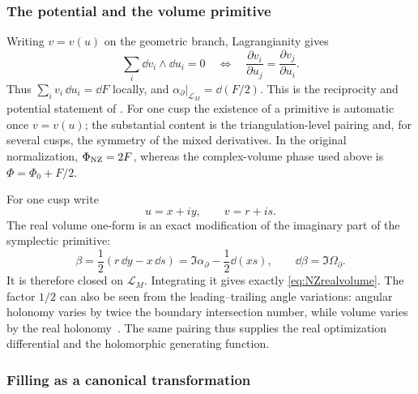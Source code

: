 \subsubsection{The potential and the volume primitive}

Writing $v=v(u)$ on the geometric branch, Lagrangianity gives
\begin{equation}
 \sum_i\dd v_i\wedge\dd u_i=0
 \quad\Longleftrightarrow\quad
 \frac{\partial v_i}{\partial u_j}
       =\frac{\partial v_j}{\partial u_i}.
 \label{eq:NZreciprocity}
\end{equation}
Thus $\sum_i v_i\,\dd u_i=\dd F$ locally, and
$\alpha_\partial|_{\mathcal L_M}=\dd(F/2)$.
This is the reciprocity and potential statement of
\cite[Theorem 3]{NeumannZagier}. For one cusp the existence of a
primitive is automatic once $v=v(u)$; the substantial content is
the triangulation-level pairing and, for several cusps, the
symmetry of the mixed derivatives. In the original normalization,
$\Phi_{\rm NZ}=2F$, whereas the complex-volume phase used above is
$\Phi=\Phi_0+F/2$.

For one cusp write
\[
 u=x+iy,\qquad v=r+is.
\]
The real volume one-form is an exact modification of the imaginary
part of the symplectic primitive:
\begin{equation}
 \beta=\frac12(r\,\dd y-x\,\dd s)
       =\Im\alpha_\partial-\frac12\dd(xs),\qquad
 \dd\beta=\Im\Omega_\partial.
 \label{eq:NZvolumeprimitive}
\end{equation}
It is therefore closed on $\mathcal L_M$. Integrating it gives exactly
\eqref{eq:NZrealvolume}. The factor $1/2$ can also be seen from
the leading--trailing angle variations: angular holonomy varies by
twice the boundary intersection number, while volume varies by the
real holonomy~\cite[Lemma 4.4 and Proposition 5.4]{FuterGueritaud}.
The same pairing thus supplies the real optimization differential
and the holomorphic generating function.

\subsubsection{Filling as a canonical transformation}

